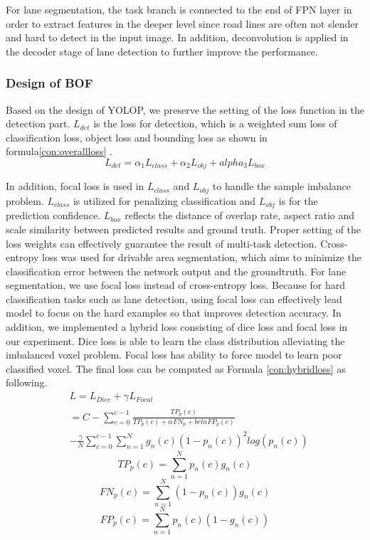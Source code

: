\documentclass[10pt,twocolumn,letterpaper]{article}
\begin{document}
For lane segmentation, the task branch is connected to the end of FPN layer in order to extract features in the deeper level since road lines are often not slender and hard to detect in the input image. In addition, deconvolution is applied in the decoder stage of lane detection to further improve the performance.


\subsubsection{Design of BOF}
Based on the design of YOLOP, we preserve the setting of the loss function in the detection part. $L_{det}$ is the loss for detection, which is a weighted sum loss of classification loss, object loss and bounding loss as shown in formula\ref{con:overallloss} .
\begin{equation}
L_{det}=\alpha_{1} L _{class} +\alpha_{2}L_{obj}+alpha_{3}L_{box}\label{con:overallloss}
\end{equation}

In addition, focal loss is used in $L_{class}$ and $L_{obj}$ to handle the sample imbalance problem. $L_{class}$ is utilized for penalizing classification and $L_{obj}$ is for the prediction confidence. $L_{box}$ reflects the distance of overlap rate, aspect ratio and scale similarity between predicted results and ground truth. Proper setting of the loss weights can effectively guarantee the result of multi-task detection.
Cross-entropy loss was used for drivable area segmentation, which aims to minimize the classification error between the network output and the groundtruth. For lane segmentation, we use focal loss instead of cross-entropy loss. Because for hard classification tasks such as lane detection, using focal loss can effectively lead model to focus on the hard examples so that improves detection accuracy. 
In addition, we implemented a hybrid loss \cite{zhu2019anatomynet} consisting of dice loss and focal loss in our experiment. Dice loss is able to learn the class distribution alleviating the imbalanced voxel problem. Focal loss has ability to force model to learn poor classified voxel. The final loss can be computed as Formula \ref{con:hybridloss} as following.
\begin{equation}
\begin{split}
&L=L_{Dice} +\gamma_{}L_{Focal}\\
&=C-\sum_{c=0}^{c-1}\frac{TP_{p}(c)}{TP_{p}(c)+\alpha_{}FN_{p}+beta_{}FP_{p}(c)}\\
&-\frac{\gamma}{N}\sum_{c=0}^{c-1}\sum_{n=1}^{N}g_{n}(c)(1-p_{n}(c))^2log(p_{n}(c))\label{con:hybridloss}
\end{split}
\end{equation}
\begin{equation}
TP_{p}(c)=\sum_{n=1}^{N}p_{n}(c)g_{n}(c)\label{con:truepositive}
\end{equation}
\begin{equation}
FN_{p}(c)=\sum_{n=1}^{N}(1-p_{n}(c))g_{n}(c)\label{confalsenegative}
\end{equation}
\begin{equation}
FP_{p}(c)=\sum_{n=1}^{N}p_{n}(c)(1-g_{n}(c))\label{con:falsepositive}
\end{equation}
\end{document}

